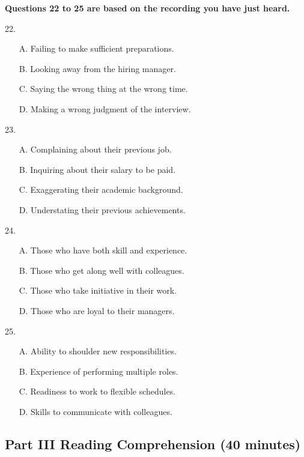 \documentclass[UTF8,11pt]{ctexart}
\begin{document}
\textbf{Questions 22 to 25 are based on the recording you have just heard.}


22.


\begin{itemize}[leftmargin=2em,itemsep=.2em,topsep=.4em]\item[A.] Failing to make sufficient preparations.
\item[B.] Looking away from the hiring manager.
\item[C.] Saying the wrong thing at the wrong time.
\item[D.] Making a wrong judgment of the interview.
\end{itemize}

23.


\begin{itemize}[leftmargin=2em,itemsep=.2em,topsep=.4em]\item[A.] Complaining about their previous job.
\item[B.] Inquiring about their salary to be paid.
\item[C.] Exaggerating their academic background.
\item[D.] Understating their previous achievements.
\end{itemize}

24.


\begin{itemize}[leftmargin=2em,itemsep=.2em,topsep=.4em]\item[A.] Those who have both skill and experience.
\item[B.] Those who get along well with colleagues.
\item[C.] Those who take initiative in their work.
\item[D.] Those who are loyal to their managers.
\end{itemize}

25.


\begin{itemize}[leftmargin=2em,itemsep=.2em,topsep=.4em]\item[A.] Ability to shoulder new responsibilities.
\item[B.] Experience of performing multiple roles.
\item[C.] Readiness to work to flexible schedules.
\item[D.] Skills to communicate with colleagues.
\end{itemize}

\subsection*{\textbf{Part }III \textbf{Reading Comprehension} \textbf{(40 minutes)}}
\end{document}
